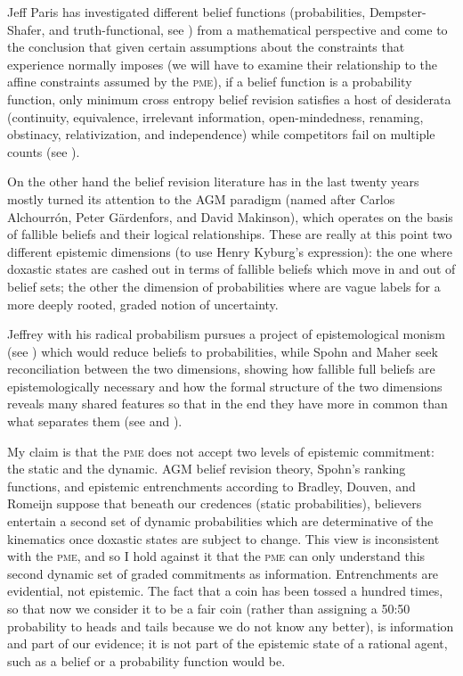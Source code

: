 Jeff Paris has investigated different belief functions (probabilities,
Dempster-Shafer, and truth-functional, see ) from
a mathematical perspective and come to the conclusion that given
certain assumptions about the constraints that experience normally
imposes (we will have to examine their relationship to the affine
constraints assumed by the \textsc{pme}), if a belief function is a
probability function, only minimum cross entropy belief revision
satisfies a host of desiderata (continuity, equivalence, irrelevant
information, open-mindedness, renaming, obstinacy, relativization, and
independence) while competitors fail on multiple counts (see
).

On the other hand the belief revision literature has in the last
twenty years mostly turned its attention to the AGM paradigm (named
after Carlos Alchourr{\'o}n, Peter G{\"a}rdenfors, and David
Makinson), which operates on the basis of fallible beliefs and their
logical relationships. These are really at this point two different
epistemic dimensions (to use Henry Kyburg's expression): the one where
doxastic states are cashed out in terms of fallible beliefs which move
in and out of belief sets; the other the dimension of probabilities
where  are vague labels for a more deeply rooted,
graded notion of uncertainty.

Jeffrey with his radical probabilism pursues a project of
epistemological monism (see ) which would reduce
beliefs to probabilities, while Spohn and Maher seek reconciliation
between the two dimensions, showing how fallible full beliefs are
epistemologically necessary and how the formal structure of the two
dimensions reveals many shared features so that in the end they have
more in common than what separates them (see 
and ).

My claim is that the \textsc{pme} does not accept two levels of
epistemic commitment: the static and the dynamic. AGM belief revision
theory, Spohn's ranking functions, and epistemic entrenchments
according to Bradley, Douven, and Romeijn suppose that beneath our
credences (static probabilities), believers entertain a second set of
dynamic probabilities which are determinative of the kinematics once
doxastic states are subject to change. This view is inconsistent with
the \textsc{pme}, and so I hold against it that the \textsc{pme} can
only understand this second dynamic set of graded commitments as
information. Entrenchments are evidential, not epistemic. The fact
that a coin has been tossed a hundred times, so that now we consider
it to be a fair coin (rather than assigning a 50:50 probability to
heads and tails because we do not know any better), is information and
part of our evidence; it is not part of the epistemic state of a
rational agent, such as a belief or a probability function would be.

